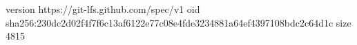 version https://git-lfs.github.com/spec/v1
oid sha256:230dc2d02f4f7f6c13af6122e77c08e4fde3234881a64ef4397108bdc2c64d1c
size 4815
